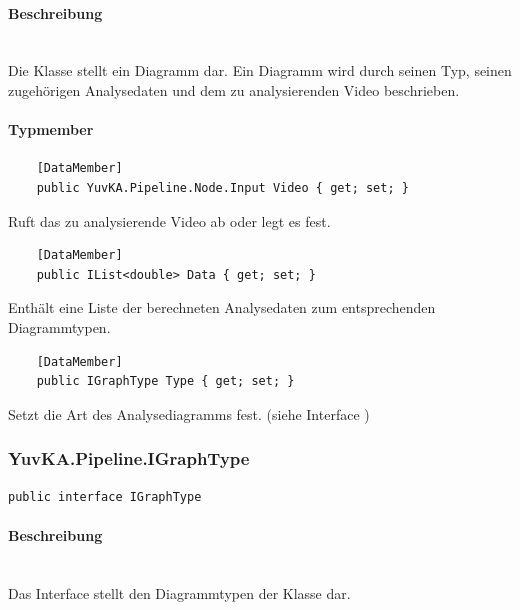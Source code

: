 \paragraph{Beschreibung}~\\
Die Klasse  stellt ein Diagramm dar. Ein Diagramm wird durch seinen Typ, seinen zugehörigen Analysedaten und dem zu analysierenden Video beschrieben.

\paragraph{Typmember}
\begin{itemize}

	\begin{verbatim}
	[DataMember]
	public YuvKA.Pipeline.Node.Input Video { get; set; }
	\end{verbatim}
	Ruft das zu analysierende Video ab oder legt es fest.
	
	\begin{verbatim}
	[DataMember]
	public IList<double> Data { get; set; }
	\end{verbatim}
	Enthält eine Liste der berechneten Analysedaten zum entsprechenden Diagrammtypen.
	
	\begin{verbatim}
	[DataMember]
	public IGraphType Type { get; set; }
	\end{verbatim}
	Setzt die Art des Analysediagramms fest. (siehe Interface )

\end{itemize}

\subsubsection{YuvKA.Pipeline.IGraphType}
\begin{verbatim}
public interface IGraphType
\end{verbatim}

\paragraph{Beschreibung}~\\
Das Interface  stellt den Diagrammtypen der Klasse  dar.

